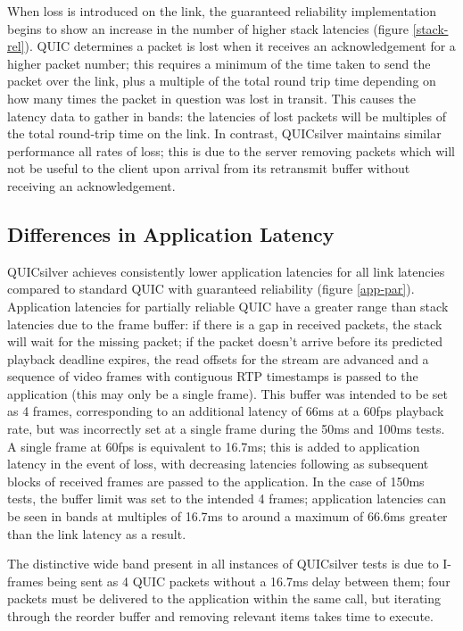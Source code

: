 \documentclass{mpaper}
\begin{document}
When loss is introduced on the link, the guaranteed reliability implementation begins to show an increase in the number of higher stack latencies (figure \ref{stack-rel}). QUIC determines a packet is lost when it receives an acknowledgement for a higher packet number; this requires a minimum of the time taken to send the packet over the link, plus a multiple of the total round trip time depending on how many times the packet in question was lost in transit. This causes the latency data to gather in bands: the latencies of lost packets will be multiples of the total round-trip time on the link. In contrast, QUICsilver maintains similar performance all rates of loss; this is due to the server removing packets which will not be useful to the client upon arrival from its retransmit buffer without receiving an acknowledgement.

\subsection{Differences in Application Latency}

QUICsilver achieves consistently lower application latencies for all link latencies compared to standard QUIC with guaranteed reliability (figure \ref{app-par}). Application latencies for partially reliable QUIC have a greater range than stack latencies due to the frame buffer: if there is a gap in received packets, the stack will wait for the missing packet; if the packet doesn't arrive before its predicted playback deadline expires, the read offsets for the stream are advanced and a sequence of video frames with contiguous RTP timestamps is passed to the application (this may only be a single frame). This buffer was intended to be set as 4 frames, corresponding to an additional latency of 66ms at a 60fps playback rate, but was incorrectly set at a single frame during the 50ms and 100ms tests. A single frame at 60fps is equivalent to 16.7ms; this is added to application latency in the event of loss, with decreasing latencies following as subsequent blocks of received frames are passed to the application. In the case of 150ms tests, the buffer limit was set to the intended 4 frames; application latencies can be seen in bands at multiples of 16.7ms to around a maximum of 66.6ms greater than the link latency as a result.


The distinctive wide band present in all instances of QUICsilver tests is due to I-frames being sent as 4 QUIC packets without a 16.7ms delay between them; four packets must be delivered to the application within the same call, but iterating through the reorder buffer and removing relevant items takes time to execute.
\end{document}
